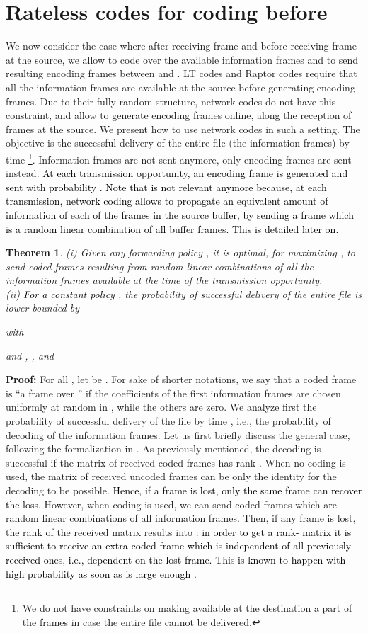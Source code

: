 \documentclass[10pt,twocolumn,conference,final]{IEEEtran}
\newtheorem{thm}{Theorem}[section]
\begin{document}
\section{Rateless codes for coding before }\label{sec:ratbef}
We now consider the case where after receiving frame  and before receiving frame  at the source, we allow to code over the available information frames and to send resulting encoding frames between  and . LT codes and Raptor codes require that all the information frames are available at the source before generating encoding frames.  
Due to their fully random structure, network codes do not have this constraint, and allow to generate encoding frames online, along the reception of frames at the source. We present how to use network codes in such a setting.
The objective is the successful delivery of the entire file (the  information frames) by time \footnote{We do not have constraints on making available at the destination a part of the  frames in case the entire file cannot be delivered.}. 
Information frames are not sent anymore, only encoding frames are sent instead. \textcolor{black}{At each transmission opportunity, an encoding frame is generated and sent with probability . Note that  is not relevant anymore because, at each transmission, network coding allows to propagate an equivalent amount of information of each of the frames in the source buffer, by sending a frame which is a random linear combination of all buffer frames. This is detailed later on.}
\begin{thm}\label{THbeforeTK}
(i) Given any forwarding policy , it is optimal, for maximizing , to send coded frames resulting from random linear combinations of all the information frames available at the time of the transmission opportunity.\\
(ii) \textcolor{black}{For a constant policy }, the probability of successful delivery of the entire file is lower-bounded by

with

and ,
, and

\end{thm}
{\bf Proof:} For all , let  be . For sake of shorter notations, we say that a coded frame is ``a frame over '' if the coefficients of the first  information frames are chosen uniformly at random in , while the others are zero. 
We analyze first the probability of successful delivery of the file by time , i.e., the probability of decoding of the  information frames. Let us first briefly discuss the general case, following the formalization in \cite{Lun}. As previously mentioned, the decoding is successful if the matrix of received coded frames has rank . When no coding is used, the matrix of received uncoded frames can be only the identity for the decoding to be possible. \textcolor{black}{Hence, if a frame is lost, only the same frame can recover the loss}. However, when coding is used, we can send coded frames which are random linear combinations of all  information frames. Then, if any frame is lost, the rank of the received matrix results into : \textcolor{black}{in order to get a rank- matrix it is sufficient to receive an extra coded frame which is independent of all previously received ones, i.e., dependent on the lost frame. This is known to happen with high probability as soon as  is large enough \cite{Lun}.} 
\end{document}

